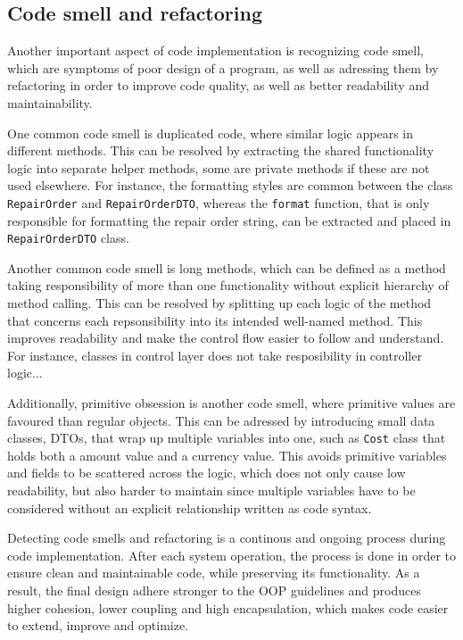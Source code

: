 \documentclass[a4paper]{scrartcl}
\begin{document}
\subsection{Code smell and refactoring}

Another important aspect of code implementation is recognizing code smell, which are symptoms of poor design of a program, as well as adressing them by refactoring in order to improve code quality, as well as better readability and maintainability. 

One common code smell is duplicated code, where similar logic appears in different methods. This can be resolved by extracting the shared functionality logic into separate helper methods, some are private methods if these are not used elsewhere. For instance, the formatting styles are common between the class \texttt{RepairOrder} and \texttt{RepairOrderDTO}, whereas the \texttt{format} function, that is only responsible for formatting the repair order string, can be extracted and placed in \texttt{RepairOrderDTO} class.

Another common code smell is long methods, which can be defined as a method taking responsibility of more than one functionality without explicit hierarchy of method calling. This can be resolved by splitting up each logic of the method that concerns each repsonsibility into its intended well-named method. This improves readability and make the control flow easier to follow and understand. For instance, classes in control layer does not take resposibility in controller logic...

Additionally, primitive obsession is another code smell, where primitive values are favoured than regular objects. This can be adressed by introducing small data classes, DTOs, that wrap up multiple variables into one, such as \texttt{Cost} class that holds both a amount value and a currency value. This avoids primitive variables and fields to be scattered across the logic, which does not only cause low readability, but also harder to maintain since multiple variables have to be considered without an explicit relationship written as code syntax.

Detecting code smells and refactoring is a continous and ongoing process during code implementation. After each system operation, the process is done in order to ensure clean and maintainable code, while preserving its functionality. As a result, the final design adhere stronger to the OOP guidelines and produces higher cohesion, lower coupling and high encapsulation, which makes code easier to extend, improve and optimize.
\end{document}
